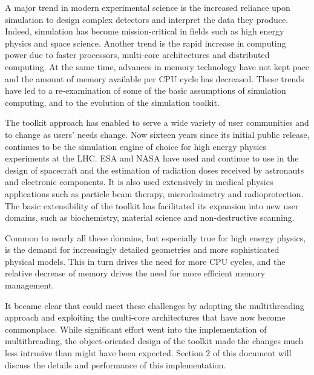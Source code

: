 \label{sec:evolution}

A major trend in modern experimental science is the increased reliance upon
simulation to design complex detectors and interpret the data they produce.
Indeed, simulation has become mission-critical in fields such as high energy
physics and space science.  Another trend is the rapid increase in computing
power due to faster processors, multi-core architectures and distributed 
computing.  At the same time, advances in memory technology have not kept
pace and the amount of memory available per CPU cycle has decreased.  These 
trends have led to a re-examination of some of the basic assumptions of 
simulation computing, and to the evolution of the \Gfour{} simulation toolkit.

The toolkit approach has enabled \Gfour{} to serve a wide variety of user 
communities and to change as users' needs change.  Now sixteen years since its
initial public release, \Gfour{} continues to be the simulation engine of choice 
for high energy physics experiments at the LHC.  ESA and NASA have used and 
continue to use \Gfour{} in the design of spacecraft and the estimation of 
radiation doses received by astronauts and electronic components.  It is also 
used extensively in medical physics applications such as particle beam therapy, 
microdosimetry and radioprotection.  The basic extensibility of the toolkit 
has facilitated its expansion into new user domains, such as biochemistry,
material science and non-destructive scanning.   

Common to nearly all these domains, but especially true for high energy physics,
is the demand for increasingly detailed geometries and more sophisticated 
physical models.  This in turn drives the need for more CPU cycles, and the 
relative decrease of memory drives the need for more efficient memory 
management.  

It became clear that \Gfour{} could meet these challenges by adopting the 
multithreading approach and exploiting the multi-core architectures that have 
now become commonplace.  While significant effort went into the implementation 
of multithreading, the object-oriented design of the toolkit made the changes 
much less intrusive than might have been expected.  Section 2 of this document
will discuss the details and performance of this implementation.


